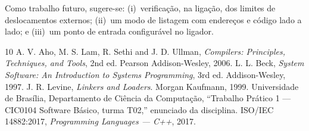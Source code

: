 \documentclass[conference]{IEEEtran}
\begin{document}
Como trabalho futuro, sugere-se: (i)~verificação, na ligação, dos limites de deslocamentos externos; (ii)~um modo de listagem com endereços e código lado a lado; e (iii)~um ponto de entrada configurável no ligador.

\begin{thebibliography}{10}
 A. V. Aho, M. S. Lam, R. Sethi and J. D. Ullman, \emph{Compilers: Principles, Techniques, and Tools}, 2nd ed. Pearson Addison-Wesley, 2006.
 L. L. Beck, \emph{System Software: An Introduction to Systems Programming}, 3rd ed. Addison-Wesley, 1997.
 J. R. Levine, \emph{Linkers and Loaders}. Morgan Kaufmann, 1999.
 Universidade de Brasília, Departamento de Ciência da Computação, ``Trabalho Prático 1 --- CIC0104 Software Básico, turma T02,'' enunciado da disciplina.
 ISO/IEC 14882:2017, \emph{Programming Languages --- C++}, 2017.
\end{thebibliography}
\end{document}
